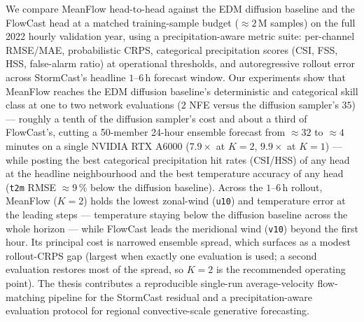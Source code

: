 \begin{abstract*}
We compare MeanFlow head-to-head against the EDM diffusion baseline and the FlowCast head at a matched training-sample budget ($\approx 2\,\text{M}$ samples) on the full 2022 hourly validation year, using a precipitation-aware metric suite: per-channel RMSE/MAE, probabilistic CRPS, categorical precipitation scores (CSI, FSS, HSS, false-alarm ratio) at operational thresholds, and autoregressive rollout error across StormCast's headline $1$--$6$\,h forecast window. Our experiments show that MeanFlow reaches the EDM diffusion baseline's deterministic and categorical skill class at one to two network evaluations ($2$ NFE versus the diffusion sampler's $35$) --- roughly a tenth of the diffusion sampler's cost and about a third of FlowCast's, cutting a 50-member 24-hour ensemble forecast from $\approx 32$ to $\approx 4$ minutes on a single NVIDIA RTX A6000 ($7.9\times$ at $K = 2$, $9.9\times$ at $K = 1$) --- while posting the best categorical precipitation hit rates (CSI/HSS) of any head at the headline neighbourhood and the best temperature accuracy of any head (\texttt{t2m} RMSE $\approx 9\,\%$ below the diffusion baseline). Across the $1$--$6$\,h rollout, MeanFlow ($K = 2$) holds the lowest zonal-wind (\texttt{u10}) and temperature error at the leading steps --- temperature staying below the diffusion baseline across the whole horizon --- while FlowCast leads the meridional wind (\texttt{v10}) beyond the first hour. Its principal cost is narrowed ensemble spread, which surfaces as a modest rollout-CRPS gap (largest when exactly one evaluation is used; a second evaluation restores most of the spread, so $K = 2$ is the recommended operating point). The thesis contributes a reproducible single-run average-velocity flow-matching pipeline for the StormCast residual and a precipitation-aware evaluation protocol for regional convective-scale generative forecasting.

\end{abstract*}
